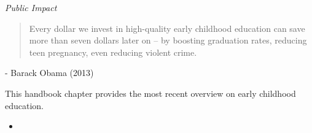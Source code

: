 \begin{frame}\begin{center}
\LARGE\textit{Public Impact}
\end{center}\end{frame}
\begin{frame}
\begin{quote}\Large
Every dollar we invest in high-quality early childhood education can save more than seven dollars later on -- by boosting graduation rates, reducing teen pregnancy, even reducing violent crime.
\end{quote}\vspace{-0.5cm}\hspace{6cm} - Barack Obama (2013)
\nocite{Obama.2013, CEA.2015}
\end{frame}
\begin{frame}\begin{figure}
\end{figure}\end{frame}
\begin{frame}
This handbook chapter provides the most recent overview on early childhood education.
\begin{itemize}

\item  {}
\end{itemize}
\end{frame}
